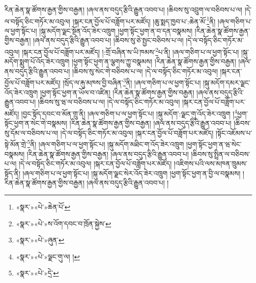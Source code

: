 རིན་ཆེན་སྣ་ཚོགས་རྒྱན་གྱིས་བརྒྱན། །ཞལ་ནས་བདུད་རྩིའི་རྒྱུན་འབབ་པ། །ཆིབས་སུ་འབྲུག་ལ་བཅིབས་པ་ལ། །དེ་ལ་བསྟོད་ཅིང་གཏོར་མ་འབུལ། །སྐར་ངན་བྱོལ་པོ་བཟློག་པར་མཛོད། །ཆུ་སྨད་ཁྱབ་པ་:ཆེན་མོ་\footnote{«སྣར་»«པེ་»ཆེན་པོ་}ནི། །ཞལ་གཅིག་པ་ལ་ཕྱག་སྟོང་པ། །སྐུ་མདོག་ལྗང་སྔོན་འོད་ཟེར་འཁྲུག །ཕྱག་སྟོང་ཕྱག་ན་བ་དན་བསྣམས། །རིན་ཆེན་སྣ་ཚོགས་རྒྱན་གྱིས་བརྒྱན། །ཞལ་ནས་བདུད་རྩིའི་རྒྱུན་འབབ་པ། །ཆིབས་སུ་ཅེ་སྤྱང་བཅིབས་པ་ལ། །དེ་ལ་བསྟོད་ཅིང་གཏོར་མ་འབུལ། །སྐར་ངན་བྱོལ་པོ་བཟློག་པར་མཛོད། །:གྲོ་བཞིན་ས་ཡི་ཁམས་\footnote{«སྣར་»«པེ་»ས་འོག་དབང་བ་ཁྲོན་སྐྱེས་}པ་ནི། །ཞལ་གཅིག་པ་ལ་ཕྱག་སྟོང་པ། །སྐུ་མདོག་སྨུག་པོ་འོད་ཟེར་འཁྲུག །ཕྱག་སྟོང་ཕྱག་ན་ལྕགས་ཀྱུ་བསྣམས། །རིན་ཆེན་སྣ་ཚོགས་རྒྱན་གྱིས་བརྒྱན། །ཞལ་ནས་བདུད་རྩིའི་རྒྱུན་འབབ་པ། །ཆིབས་སུ་སེང་གེ་བཅིབས་པ་ལ། །དེ་ལ་བསྟོད་ཅིང་གཏོར་མ་འབུལ། །སྐར་ངན་བྱོལ་པོ་བཟློག་པར་མཛོད། །སྲོད་ལ་རྐུ་མཁས་བྱི་བཞིན་\footnote{«སྣར་»«པེ་»ཞུན་}ནི། །ཞལ་གཅིག་པ་ལ་ཕྱག་སྟོང་པ། །སྐུ་མདོག་དམར་ལྗང་འོད་ཟེར་འཁྲུག །ཕྱག་སྟོང་ཕྱག་ན་ཡོལ་བ་འཛིན། །རིན་ཆེན་སྣ་ཚོགས་རྒྱན་གྱིས་བརྒྱན། །ཞལ་ནས་བདུད་རྩིའི་རྒྱུན་འབབ་པ། །ཆིབས་སུ་ཝ་ལ་བཅིབས་པ་ལ། །དེ་ལ་བསྟོད་ཅིང་གཏོར་མ་འབུལ། །སྐར་ངན་བྱོལ་པོ་བཟློག་པར་མཛོད། །བྱང་སྟོད་དབང་བ་མོན་གྲུ་ནི། །ཞལ་གཅིག་པ་ལ་ཕྱག་སྟོང་པ། །སྐུ་མདོག་:ལྗང་གུ་འོད་ཟེར་འཁྲུག །\footnote{«སྣར་»«པེ་»ལྗང་གུ་ལ། །}ཕྱག་སྟོང་ཕྱག་ན་སེང་གེ་བསྣམས། །རིན་ཆེན་སྣ་ཚོགས་རྒྱན་གྱིས་བརྒྱན། །ཞལ་ནས་བདུད་རྩིའི་རྒྱུན་འབབ་པ། །ཆིབས་སུ་དོམ་ལ་བཅིབས་པ་ལ། །དེ་ལ་བསྟོད་ཅིང་གཏོར་མ་འབུལ། །སྐར་ངན་བྱོལ་པོ་བཟློག་པར་མཛོད། །སྟོང་འཇོམས་པ་སྟེ་མོན་གྲེ་\footnote{«སྣར་»«པེ་»དྲེ་}ནི། །ཞལ་གཅིག་པ་ལ་ཕྱག་སྟོང་པ། །སྐུ་མདོག་མཐིང་ག་འོད་ཟེར་འཁྲུག །ཕྱག་སྟོང་ཕྱག་ན་ཝ་སེང་བསྣམས། །རིན་ཆེན་སྣ་ཚོགས་རྒྱན་གྱིས་བརྒྱན། །ཞལ་ནས་བདུད་རྩིའི་རྒྱུན་འབབ་པ། །ཆིབས་སུ་སྤྲིན་ལ་བཅིབས་པ་ལ། །དེ་ལ་བསྟོད་ཅིང་གཏོར་མ་འབུལ། །སྐར་ངན་བྱོལ་པོ་བཟློག་པར་མཛོད། །འཇིགས་པའི་ལས་མཁན་ཁྲུམས་སྟོད་ནི། །ཞལ་གཅིག་པ་ལ་ཕྱག་སྟོང་པ། །སྐུ་མདོག་ལྗང་སེར་འོད་ཟེར་འཁྲུག །ཕྱག་སྟོང་ཕྱག་ན་བྱི་ལ་བསྣམས། །རིན་ཆེན་སྣ་ཚོགས་རྒྱན་གྱིས་བརྒྱན། །ཞལ་ནས་བདུད་རྩིའི་རྒྱུན་འབབ་པ། །
